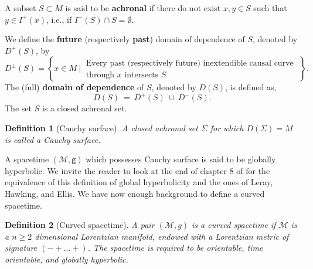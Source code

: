 \documentclass[10pt]{book}
\newcommand{\Mcal}{\mathcal{M}}
\newcommand{\gsf}{\mathsf{g}}
\theoremstyle{break}
\newtheorem{definition}{Definition}
\begin{document}
\bigskip


A subset $S \subset M$ is said to be \textbf{achronal} if there do not exist $x, y \in S$ such that $y \in I^{+}(x)$, i.e., if $I^{+}(S) \cap S = \emptyset$. 


\bigskip


We define the \textbf{future} (respectively \textbf{past}) domain of dependence of $S$, denoted by $D^{+}(S)$, by
%
\begin{equation*}
D^{\pm}(S) = \left\{ x \in M \ \bigg| \ \begin{array}{l} \text{Every past (respectively future) inextendible causal curve} \\ \text{through $x$ intersects $S$} \end{array} \; \right\}.
\end{equation*}
%
The (full) \textbf{domain of dependence} of $S$, denoted by $D(S)$, is defined as,
\begin{equation*}
D(S) \ = \ D^{+}(S) \ \cup \ D^{-}(S).
\end{equation*}
The set $S$ is a closed achronal set.



\bigskip




\begin{definition}[Cauchy surface]
A closed achronal set $\Sigma$ for which $D(\Sigma) = M$ is called a Cauchy surface. 
\end{definition}

A spacetime $(\Mcal,\gsf)$ which possesses Cauchy surface is said to be globally hyperbolic. We invite the reader to look at the end of chapter $8$ of %
for the equivalence of this definition of global hyperbolicity and the ones of Leray, Hawking, and Ellis. 
We have now enough background to define a curved spacetime.

\begin{definition}[Curved spacetime]\label{def:CST}
A pair $(\Mcal,g)$ is a curved spacetime if $\Mcal$ is a $n \geq 2$ dimensional Lorentzian manifold, endowed with a Lorentzian metric of signature $( - + \dots +)$. The spacetime is required to be orientable, time orientable, and globally hyperbolic. 
\end{definition}
\end{document}
